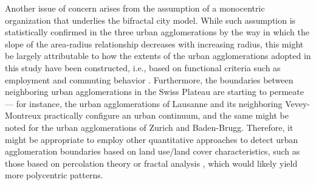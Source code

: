 Another issue of concern arises from the assumption of a monocentric organization that underlies the bifractal city model.
While such assumption is statistically confirmed in the three urban agglomerations by the way in which the slope of the area-radius relationship decreases with increasing radius, this might be largely attributable to how the extents of the urban agglomerations adopted in this study have been constructed, i.e., based on functional criteria such as employment and commuting behavior .
Furthermore, the boundaries between neighboring urban agglomerations in the Swiss Plateau are starting to permeate --- for instance, the urban agglomerations of Lausanne and its neighboring Vevey-Montreux practically configure an urban continuum, and the same might be noted for the urban agglomerations of Zurich and Baden-Brugg. Therefore, it might be appropriate to employ other quantitative approaches to detect urban agglomeration boundaries based on land use/land cover characteristics, such as those based on percolation theory \citep{rozenfeld2008laws} or fractal analysis \citep{tannier2013defining}, which would likely yield more polycentric patterns.


